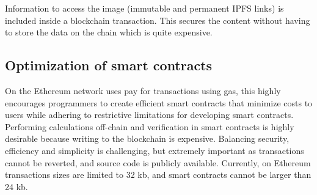 \documentclass[12pt,tightenlines,letterpaper]{scrartcl}
\begin{document}
Information to access the image (immutable and permanent IPFS links) is included inside a blockchain transaction. This secures the content without having to store the data on the chain which is quite expensive.   
 \subsection{Optimization of smart contracts}
 
 On the \gls{Ethereum} network uses pay for transactions using \gls{gas}, this highly encourages programmers to create efficient \glspl{smart contract} that minimize costs to users while adhering to restrictive limitations for developing smart contracts. Performing calculations off-chain and verification in \glspl{smart contract} is highly desirable because writing to the blockchain is expensive. Balancing security, efficiency and simplicity is challenging, but extremely important as transactions cannot be reverted, and source code is publicly available. Currently, on Ethereum transactions sizes are limited to 32 kb, and \glspl{smart contract} cannot be larger than 24 kb.
 
\end{document}
